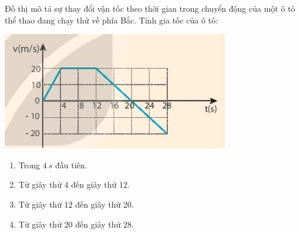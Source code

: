 \begin{ex}
	Đồ thị mô tả sự thay đổi vận tốc theo thời gian trong chuyển động của một ô tô thể thao đang chạy thử về phía Bắc. Tính gia tốc của ô tô:
	\begin{center}
		\includegraphics[scale=1]{figs/G10Y25B6-20}
	\end{center}
	
	\begin{enumerate}[label=\alph*)]
		\item Trong $\SI{4}{s}$ đầu tiên.
		\item Từ giây thứ 4 đến giây thứ 12.
		\item Từ giây thứ 12 đến giây thứ 20.
		\item Từ giây thứ 20 đến giây thứ 28.
	\end{enumerate}
\end{ex}


